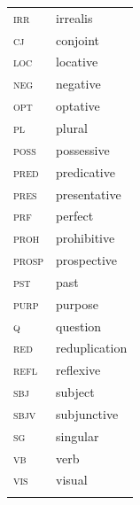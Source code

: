 \documentclass[output=paper,colorlinks,citecolor=brown]{langscibook}
\begin{document}
\begin{tabularx}{.41\textwidth}{lQ}
\textsc{irr} & irrealis \\ 
\textsc{cj} & conjoint \\
\textsc{loc} & locative \\ 
\textsc{neg} & negative \\ 
\textsc{opt} & optative \\ 
\textsc{pl} & plural \\ 
\textsc{poss} & possessive \\ 
\textsc{pred} & predicative \\ 
\textsc{pres} & presentative \\ 
\textsc{prf} & perfect \\ 
\textsc{proh} & prohibitive \\ 
\textsc{prosp} & prospective \\ 
\textsc{pst} & past \\ 
\textsc{purp} & purpose \\ 
\textsc{q} & question \\ 
\textsc{red} & reduplication \\ 
\textsc{refl} & reflexive \\ 
\textsc{sbj} & subject \\ 
\textsc{sbjv} & subjunctive \\ 
\textsc{sg} & singular \\ 
\textsc{vb} & verb \\ 
\textsc{vis} & visual \\
\\
\end{tabularx}


\sloppy\printbibliography[heading=subbibliography,notkeyword=this]
\end{document}
